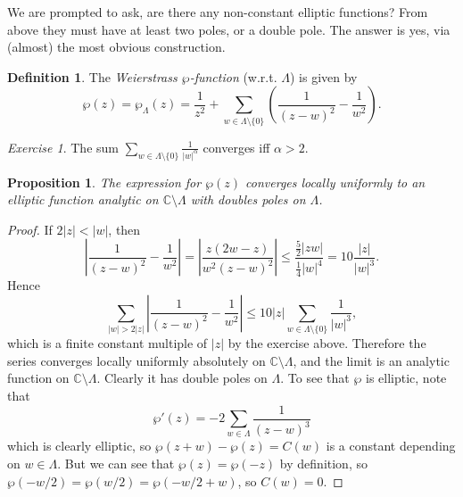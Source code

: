 \documentclass[a4paper]{article}
\theoremstyle{plain}
\newtheorem{proposition}[theorem]{Proposition}
\theoremstyle{remark}
\newtheorem*{exercise}{Exercise}
\theoremstyle{definition}
\newtheorem*{definition}{Definition}
\newcommand{\C}{\mathbb{C}}
\begin{document}
We are prompted to ask, are there any non-constant elliptic functions? From
above they must have at least two poles, or a double pole. The answer is yes,
via (almost) the most obvious construction.

\begin{definition}
    The \emph{Weierstrass $\wp$-function} (w.r.t. $\Lambda$) is given by
    \begin{equation*}
        \wp(z) = \wp_\Lambda(z)
            = \frac{1}{z^2} + \sum_{w\in\Lambda\setminus\{0\}}
                \left(\frac{1}{(z-w)^2}-\frac{1}{w^2}\right).
    \end{equation*}
\end{definition}

\begin{exercise}
    The sum $\sum_{w\in\Lambda\setminus\{0\}}\frac{1}{|w|^\alpha}$ converges iff
    $\alpha>2$.
\end{exercise}

\begin{proposition}
    The expression for $\wp(z)$ converges locally uniformly to an elliptic
    function analytic on $\C\setminus\Lambda$ with doubles poles on $\Lambda$.
\end{proposition}

\begin{proof}
    If $2|z|<|w|$, then
    \begin{equation*}
        \left|\frac{1}{(z-w)^2}-\frac{1}{w^2}\right|
            = \left|\frac{z(2w-z)}{w^2(z-w)^2}\right|
            \le \frac{\frac{5}{2}|zw|}{\frac{1}{4}|w|^4}
            = 10\frac{|z|}{|w|^3}.
    \end{equation*}
    Hence
    \begin{equation*}
        \sum_{|w|>2|z|}\left|\frac{1}{(z-w)^2}-\frac{1}{w^2}\right|
        \le 10|z|\sum_{w\in\Lambda\setminus\{0\}}\frac{1}{|w|^3},
    \end{equation*}
    which is a finite constant multiple of $|z|$ by the exercise above.
    Therefore the series converges locally uniformly absolutely on
    $\C\setminus\Lambda$, and the limit is an analytic function on
    $\C\setminus\Lambda$. Clearly it has double poles on $\Lambda$. To see that
    $\wp$ is elliptic, note that
    \begin{equation*}
        \wp'(z) = -2\sum_{w\in\Lambda}\frac{1}{(z-w)^3}
    \end{equation*}
    which is clearly elliptic, so $\wp(z+w)-\wp(z)=C(w)$ is a constant depending
    on $w\in\Lambda$. But we can see that $\wp(z)=\wp(-z)$ by definition, so
    $\wp(-w/2)=\wp(w/2)=\wp(-w/2+w)$, so $C(w)=0$.
\end{proof}
\end{document}
